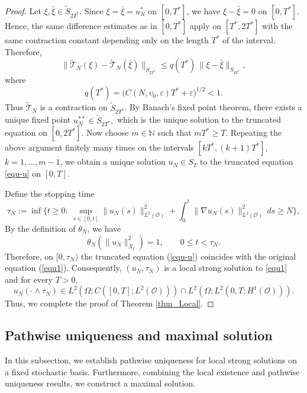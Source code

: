 \documentclass[reqno, 11pt]{amsart}
\theoremstyle{definition}
\numberwithin{equation}{section} \numberwithin{lem}{section}
\numberwithin{thm}{section} \numberwithin{prop}{section}
\numberwithin{cor}{section} \numberwithin{rem}{section}
\numberwithin{defn}{section}
\begin{document}
\begin{proof}
Let $\xi,\bar\xi\in\widetilde S_{2T^*}$. Since $\xi=\bar\xi=u_N^*$ on $[0,T^*]$, we have $\xi-\bar\xi=0$ on $[0,T^*]$. Hence, the same difference estimates as in $[0,T^*]$ apply on $[T^*,2T^*]$ with the same contraction constant depending only on the length $T^*$ of the interval. Therefore,
\[
\|\widetilde{\mathcal T}_N(\xi)-\widetilde{\mathcal T}_N(\bar\xi)\|_{ S_{2T^*}}
\le
q(T^*)\,\|\xi-\bar\xi\|_{S_{2T^*}},
\]
where
\[
q(T^*)
=
\big(C(N,v_0,\varepsilon)T^*+\varepsilon\big)^{1/2}<1.
\]
Thus $\widetilde{\mathcal T}_N$ is a contraction on $\widetilde S_{2T^*}$. By Banach's fixed point theorem, there exists a unique fixed point $u_N^{**}\in \widetilde S_{2T^*},$
which is the unique solution to the truncated equation on $[0,2T^*]$. Now choose $m\in\mathbb N$ such that $mT^*\ge T$. Repeating the above argument finitely many times on the intervals $[kT^*,(k+1)T^*]$, $k=1,\dots,m-1$, we obtain a unique solution $u_N\in S_T$ to the truncated equation \eqref{equ-u} on $[0,T]$.

Define the stopping time
      $$\tau_N:=\inf\big\{t\ge 0:\ \sup_{s\in[0,t]}\|u_N(s)\|_{L^2(\mathcal {O})}^2+\int_0^t\|\nabla u_N(s)\|_{L^2(\mathcal {O})}^2\,ds\ge N\big\},$$
By the definition of $\theta_N$, we have
\[
\theta_N(\|u_N\|_{X_t}^2)=1,
\qquad  0\le t <\tau_N.
\]
Therefore, on $[0,\tau_N)$ the truncated equation (\ref{equ-u}) coincides with the original equation (\ref{equ1}). Consequently, $(u_N,\tau_N)$ is a local strong solution to \eqref{equ1} and for every \(T>0\),
\[
u_N(\cdot\wedge\tau_N)
\in L^2(\Omega;C([0,T];L^2(\mathcal O)))
\cap L^2(\Omega;L^2(0,T;H^1(\mathcal O))).
\] 
Thus, we complete the proof of Theorem \ref{thm_Local}.
\end{proof}
\subsection{Pathwise uniqueness and maximal solution}
In this subsection, we establish pathwise uniqueness for local strong solutions  on a fixed stochastic basis. Furthermore, combining the local existence and pathwise uniqueness results, we construct a maximal  solution.
\end{document}
